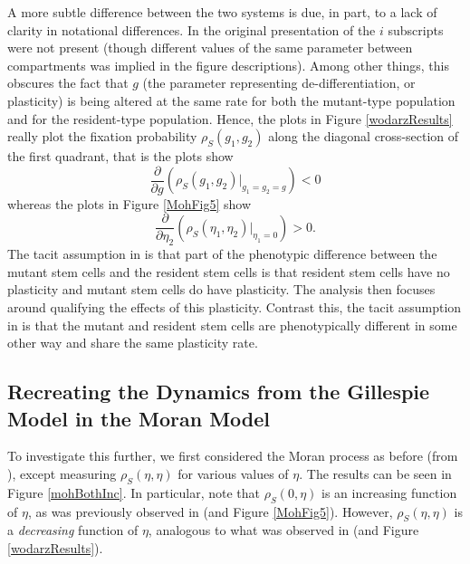 \documentclass[12pt]{article}
\begin{document}
A more subtle difference between the two systems is due, in part, to a lack of clarity in notational differences. In the original presentation of \cite{wodarz} the $i$ subscripts were not present (though different values of the same parameter between compartments was implied in the figure descriptions). Among other things, this obscures the fact that $g$ (the parameter representing de-differentiation, or plasticity) is being altered at the same rate for both the mutant-type population and for the resident-type population. Hence, the plots in Figure \ref{wodarzResults} really plot the fixation probability $\rho_S(g_1,g_2)$ along the diagonal cross-section of the first quadrant, that is the plots show
\[
\frac{\partial}{\partial g}\left(\rho_S(g_1,g_2)\big|_{g_1=g_2=g}\right)<0
\]
whereas the plots in Figure \ref{MohFig5} show
\[
\frac{\partial}{\partial \eta_2}\left(\rho_S(\eta_1,\eta_2)\big|_{\eta_1=0}\right)>0.
\]
The tacit assumption in \cite{mohammad} is that part of the phenotypic difference between the mutant stem cells and the resident stem cells is that resident stem cells have no plasticity and mutant stem cells do have plasticity. The analysis then focuses around qualifying the effects of this plasticity. Contrast this, the tacit assumption in \cite{wodarz} is that the mutant and resident stem cells are phenotypically different in some other way and share the same plasticity rate.


\subsection{Recreating the Dynamics from the Gillespie Model in the Moran Model}
To investigate this further, we first considered the Moran process as before (from \cite{mohammad}), except measuring $\rho_S(\eta, \eta)$ for various values of $\eta$. The results can be seen in Figure \ref{mohBothInc}. In particular, note that $\rho_S(0,\eta)$ is an increasing function of $\eta$, as was previously observed in \cite{mohammad} (and Figure \ref{MohFig5}). However, $\rho_S(\eta, \eta)$ is a \textit{decreasing} function of $\eta$, analogous to what was observed in \cite{wodarz} (and Figure \ref{wodarzResults}).
\end{document}
